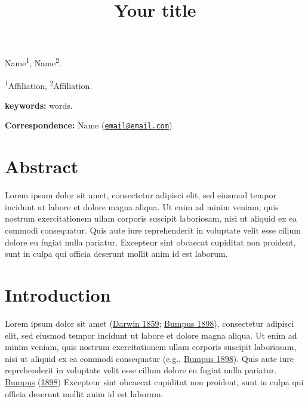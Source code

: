 \documentclass[
  12pt,
]{article}
\title{Your title}
\author{}
\date{\vspace{-2.5em}}
\begin{document}
\maketitle

Name\textsuperscript{1}, Name\textsuperscript{2}. \newline

\textsuperscript{1}Affiliation, \newline
\textsuperscript{2}Affiliation. \newline

\textbf{keywords:} words. \newline

\textbf{Correspondence:} \newline
Name (\href{mailto:email@email.com}{\nolinkurl{email@email.com}}) \newline

\pagebreak

\hypertarget{abstract}{%
\section*{Abstract}\label{abstract}}

Lorem ipsum dolor sit amet, consectetur adipisci elit, sed eiusmod tempor incidunt ut labore et dolore magna aliqua. Ut enim ad minim veniam, quis nostrum exercitationem ullam corporis suscipit laboriosam, nisi ut aliquid ex ea commodi consequatur. Quis aute iure reprehenderit in voluptate velit esse cillum dolore eu fugiat nulla pariatur. Excepteur sint obcaecat cupiditat non proident, sunt in culpa qui officia deserunt mollit anim id est laborum.

\pagebreak

\hypertarget{intro}{%
\section{Introduction}\label{intro}}

Lorem ipsum dolor sit amet (\protect\hyperlink{ref-Darwin1859}{Darwin 1859}; \protect\hyperlink{ref-Bumpus1898}{Bumpus 1898}), consectetur adipisci elit, sed eiusmod tempor incidunt ut labore et dolore magna aliqua. Ut enim ad minim veniam, quis nostrum exercitationem ullam corporis suscipit laboriosam, nisi ut aliquid ex ea commodi consequatur (e.g., \protect\hyperlink{ref-Bumpus1898}{Bumpus 1898}). Quis aute iure reprehenderit in voluptate velit esse cillum dolore eu fugiat nulla pariatur. \protect\hyperlink{ref-Bumpus1898}{Bumpus} (\protect\hyperlink{ref-Bumpus1898}{1898}) Excepteur sint obcaecat cupiditat non proident, sunt in culpa qui officia deserunt mollit anim id est laborum.
\end{document}
